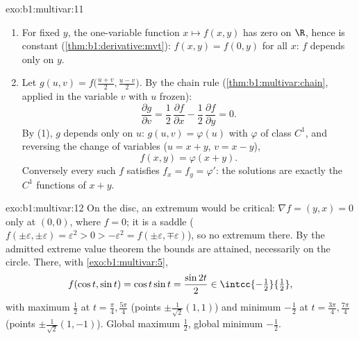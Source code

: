 \begin{solution}{exo:b1:multivar:11}
\begin{enumerate}
  \item For fixed $y$, the one-variable function $x \mapsto
        f(x,y)$ has zero  on $\R$, hence is constant
        (\cref{thm:b1:derivative:mvt}): $f(x, y) = f(0, y)$ for
        all $x$: $f$ depends only on $y$.
  \item Let $g(u, v) = f\bigl(\frac{u+v}2, \frac{u-v}2\bigr)$.
        By the chain rule (\cref{thm:b1:multivar:chain}, applied
        in the variable $v$ with $u$ frozen):
        \[
        \frac{\partial g}{\partial v}
        = \frac12\,\frac{\partial f}{\partial x}
        - \frac12\,\frac{\partial f}{\partial y} = 0 .
        \]
        By (1), $g$ depends only on $u$: $g(u, v) = \varphi(u)$
        with $\varphi$ of class $C^1$, and reversing the change
        of variables ($u = x + y$, $v = x - y$),
        \[
        f(x, y) = \varphi(x + y).
        \]
        Conversely every such $f$ satisfies $f_x = f_y =
        \varphi'$: the solutions are exactly the $C^1$ functions
        of $x + y$.
\end{enumerate}
\end{solution}

\begin{solution}{exo:b1:multivar:12}
On the  disc, an extremum would be critical: $\nabla f = (y,
x) = 0$ only at $(0,0)$, where $f = 0$; it is a saddle ($f(\pm
\varepsilon, \pm\varepsilon) = \varepsilon^2 > 0 > -\varepsilon^2
= f(\pm\varepsilon, \mp\varepsilon)$), so no extremum there. By
the admitted extreme value theorem the bounds are attained,
necessarily on the  circle. There, with
\cref{exo:b1:multivar:5},
\[
f(\cos t, \sin t) = \cos t\sin t = \frac{\sin 2t}{2}
\in \intcc{-\tfrac12}{\tfrac12},
\]
with maximum $\frac12$ at $t = \frac\pi4, \frac{5\pi}4$ (points
$\pm\frac{1}{\sqrt2}(1,1)$) and minimum $-\frac12$ at $t =
\frac{3\pi}4, \frac{7\pi}4$ (points $\pm\frac{1}{\sqrt2}(1,-1)$).
Global maximum $\frac12$, global minimum $-\frac12$.
\end{solution}

